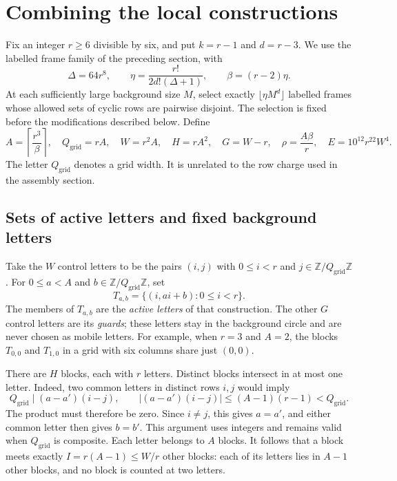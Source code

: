 \section{Combining the local constructions}
\label{sec-global}

Fix an integer $r\ge6$ divisible by six, and put $k=r-1$ and $d=r-3$.
We use the labelled frame family of the preceding section, with
\[
 \Delta=64r^8,\qquad
 \eta=\frac{r!}{2d!(\Delta+1)},\qquad
 \beta=(r-2)\eta.
\]
At each sufficiently large background size $M$, select exactly
$\lfloor\eta M^d\rfloor$ labelled frames whose allowed sets of cyclic
rows are pairwise disjoint. The selection is fixed before the modifications
described below. Define
\begin{equation}\label{eq-global-parameters}
 A=\left\lceil\frac{r^3}{\beta}\right\rceil,\quad
 Q_{
 \mathrm{grid}}=rA,\quad W=r^2A,\quad H=rA^2,\quad
 G=W-r,\quad \rho=\frac{A\beta}{r},\quad
 E=10^{12}r^{22}W^4.
\end{equation}
The letter $Q_{\mathrm{grid}}$ denotes a grid width. It is unrelated to
the row charge used in the assembly section.

\subsection{Sets of active letters and fixed background letters}

Take the $W$ control letters to be the pairs $(i,j)$ with
$0\le i<r$ and $j\in\mathbb Z/Q_{\mathrm{grid}}\mathbb Z$.
For $0\le a<A$ and $b\in\mathbb Z/Q_{\mathrm{grid}}\mathbb Z$, set
\[
 T_{a,b}=\{(i,ai+b):0\le i<r\}.
\]
The members of $T_{a,b}$ are the \emph{active letters} of that
construction. The other $G$ control letters are its \emph{guards}; these
letters stay in the background circle and are never chosen as mobile
letters. For example, when $r=3$ and $A=2$, the blocks $T_{0,0}$ and
$T_{1,0}$ in a grid with six columns share just $(0,0)$.

There are $H$ blocks, each with $r$ letters. Distinct blocks intersect
in at most one letter. Indeed, two common letters in distinct rows $i,j$
would imply
\[
 Q_{\mathrm{grid}}\mid(a-a')(i-j),\qquad
 |(a-a')(i-j)|\le(A-1)(r-1)<Q_{\mathrm{grid}}.
\]
The product must therefore be zero. Since $i\ne j$, this gives $a=a'$,
and either common letter then gives $b=b'$. This argument uses integers
and remains valid when $Q_{\mathrm{grid}}$ is composite. Each letter
belongs to $A$ blocks. It follows that a block meets exactly
$I=r(A-1)\le W/r$ other blocks: each of its letters lies in $A-1$ other
blocks, and no block is counted at two letters.

